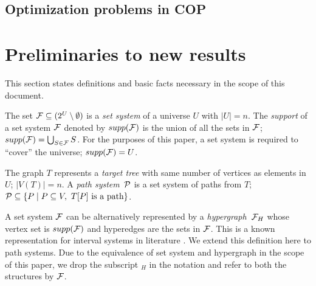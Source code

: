 \documentclass[MS]             %
              {iitmdiss_as}    %
\begin{document}
\section{Optimization problems in COP}







\chapter{Preliminaries to new results}
\label{ch:prelims} 

This
section states definitions and basic facts necessary in the scope of
this document.


The set ${\mathcal F} \subseteq (2^{U} \setminus \emptyset)$ is a {\em set
  system} of a universe $U$ with $|U| = n$.  The {\em support} of a
set system ${\mathcal F}$ denoted by $supp({\cal F})$ is the union of all the sets in
${\mathcal F}$; $supp({\mathcal F}) = \bigcup_{S \in {\mathcal F}}S$. For the purposes of this
paper, a set system is required to ``cover'' the universe; $
supp({\cal F}) = U$.

The graph $T$ represents a {\em target tree} with same
number of vertices as elements in $U$; $|V(T)| = n$.  A {\em path
  system}\, ${\cal P}$ is a set system of paths from $T$; ${\cal P} \subseteq \{P
\mid P \subseteq V, \text{ } T[P] \text{ is a path} \}$.

% 

A set system ${\cal F}$ can be alternatively represented by a {\em
  hypergraph}\, ${\cal F}_H$ whose vertex set is $supp({\cal F})$ and hyperedges
are the sets in ${\cal F}$. This is a known representation for interval
systems in literature \cite{bls99,kklv10}.  We extend this definition here to
path systems. Due to the equivalence of set system and hypergraph in
the scope of this paper, we drop the
subscript $_H$ in the notation and refer to both the structures by ${\cal F}$.
\end{document}
